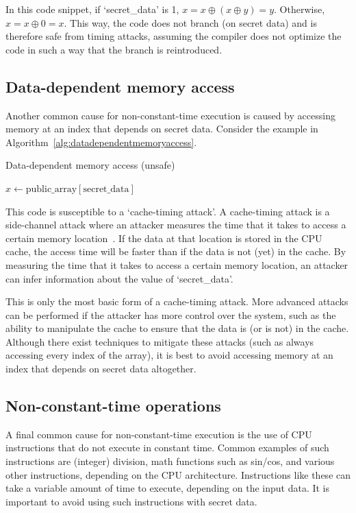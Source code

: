 \documentclass[11pt,a4paper]{report}
\theoremstyle{definition}
\begin{document}
In this code snippet, if `secret\_data' is 1, $x = x \oplus (x \oplus y) = y$. Otherwise, $x = x \oplus 0 = x$. This way, the code does not branch (on secret data) and is therefore safe from timing attacks, assuming the compiler does not optimize the code in such a way that the branch is reintroduced.

\subsection{Data-dependent memory access}
\label{sec:datadependentmemoryaccess}
Another common cause for non-constant-time execution is caused by accessing memory at an index that depends on secret data. Consider the example in Algorithm~\ref{alg:datadependentmemoryaccess}.

\begin{algorithm}
  \caption{Data-dependent memory access (unsafe)}
  \label{alg:datadependentmemoryaccess}
  \begin{algorithmic}[1]
    \State $x \gets \text{public\_array}[\text{secret\_data}]$
  \end{algorithmic}
\end{algorithm}

This code is susceptible to a `cache-timing attack'. A cache-timing attack is a side-channel attack where an attacker measures the time that it takes to access a certain memory location~\cite{bernstein2005cache, kocher1996timing}. If the data at that location is stored in the CPU cache, the access time will be faster than if the data is not (yet) in the cache. By measuring the time that it takes to access a certain memory location, an attacker can infer information about the value of `secret\_data'.

This is only the most basic form of a cache-timing attack. More advanced attacks can be performed if the attacker has more control over the system, such as the ability to manipulate the cache to ensure that the data is (or is not) in the cache. Although there exist techniques to mitigate these attacks (such as always accessing every index of the array), it is best to avoid accessing memory at an index that depends on secret data altogether.

\subsection{Non-constant-time operations}
\label{sec:nonconstanttimeoperations}
A final common cause for non-constant-time execution is the use of CPU instructions that do not execute in constant time. Common examples of such instructions are (integer) division, math functions such as sin/cos, and various other instructions, depending on the CPU architecture. Instructions like these can take a variable amount of time to execute, depending on the input data. It is important to avoid using such instructions with secret data.
\end{document}

